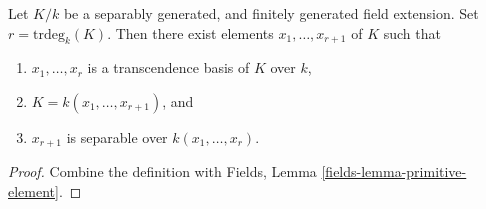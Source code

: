 \begin{lemma}
\label{lemma-generating-finitely-generated-separable-field-extensions}
Let $K/k$ be a separably generated, and finitely generated
field extension.
Set $r = \text{trdeg}_k(K)$. Then there exist elements
$x_1, \ldots, x_{r + 1}$ of $K$ such that
\begin{enumerate}
\item $x_1, \ldots, x_r$ is a transcendence basis of $K$ over $k$,
\item $K = k(x_1, \ldots, x_{r + 1})$, and
\item $x_{r + 1}$ is separable over $k(x_1, \ldots, x_r)$.
\end{enumerate}
\end{lemma}

\begin{proof}
Combine the definition with Fields, Lemma \ref{fields-lemma-primitive-element}.
\end{proof}